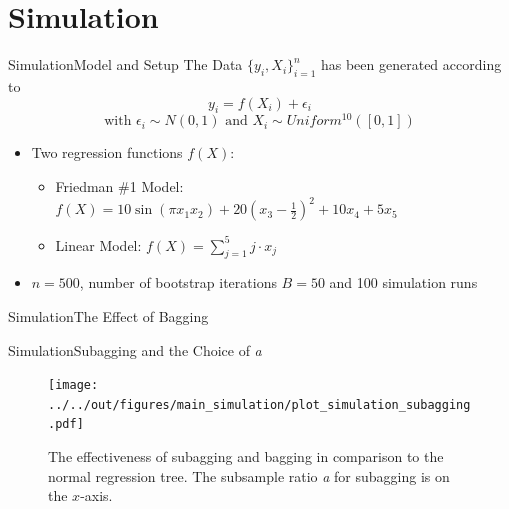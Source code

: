 \documentclass{beamer}
\begin{document}
\section{Simulation}


\begin{frame}{Simulation}{Model and Setup}
The Data $\{y_{i},X_{i} \}_{i=1}^{n}$ has been generated according to $$y_{i} = f(X_{i}) + \epsilon_{i}$$
$$\text{with }\epsilon_{i} \sim N(0,1) \text{ and } X_{i} \sim Uniform^{10}([0,1])$$
\begin{itemize}
\item Two regression functions $f(X)$:
\begin{itemize}
\item Friedman \#1 Model: $f(X) = 10 \sin(\pi x_{1} x_{2}) + 20(x_{3} - \frac{1}{2})^{2} + 10 x_{4} + 5 x_{5} $
\item Linear Model: \hspace{9mm} $f(X) = \sum_{j=1}^{5} j \cdot x_{j} $
\end{itemize}
\item $n=500$, number of bootstrap iterations $B=50$ and 100 simulation runs
\end{itemize}


\end{frame}


\begin{frame}{Simulation}{The Effect of Bagging}
\begin{table}
\resizebox{11cm}{!}{


}
\caption{The effect of bagging using regression trees. The relative error is defined as $(MSE_{\text{Tree}} - MSE_{\text{Bagging}})/ MSE_{\text{Bagging}}$.}
\end{table}

\end{frame}


\begin{frame}{Simulation}{Subagging and the Choice of \textit{a}}
\begin{center}
\begin{figure}
\texttt{[image: ../../out/figures/main\_simulation/plot\_simulation\_subagging.pdf]}
\caption{The effectiveness of subagging and bagging in comparison to the normal regression tree. The subsample ratio \textit{a} for subagging is on the $x$-axis.}
\end{figure}
\end{center}
\end{frame}
\end{document}
